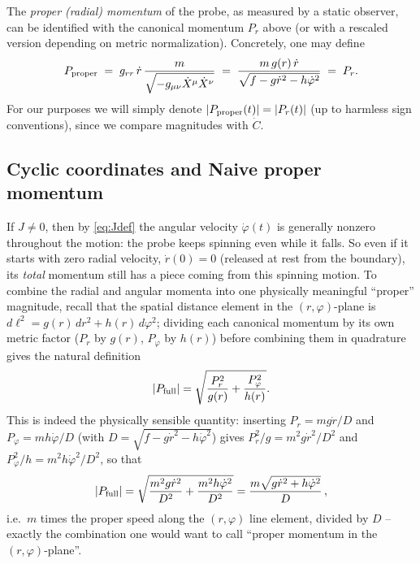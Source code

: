 \documentclass[11pt]{article}
\begin{document}
The {\it proper (radial) momentum} of the probe, as measured by a static observer, can be identified with the canonical momentum $P_r$ above (or with a rescaled version depending on metric normalization).  Concretely, one may define
\begin{equation*}
P_{\rm proper} \;=\; g_{rr}\,\dot r \,\frac{m}{\sqrt{-g_{\mu\nu}\dot X^\mu\dot X^\nu}}
\;=\; \frac{m\,g(r)\,\dot r}{\sqrt{f - g\dot r^2 - h\dot\varphi^2}} 
\;=\; P_r.
\end{equation*}
For our purposes we will simply denote $|P_{\rm proper}(t)| = |P_r(t)|$ (up to harmless sign conventions), since we compare magnitudes with $\dot C$.

\subsection{Cyclic coordinates and Naive proper momentum}

If $J\neq0$, then by \eqref{eq:Jdef} the angular velocity $\dot\varphi(t)$ is generally nonzero throughout the motion: the probe keeps spinning even while it falls. So even if it starts with zero radial velocity, $\dot r(0)=0$ (released at rest from the boundary), its \emph{total} momentum still has a piece coming from this spinning motion. To combine the radial and angular momenta into one physically meaningful ``proper'' magnitude, recall that the spatial distance element in the $(r,\varphi)$-plane is $d\ell^2=g(r)\,dr^2+h(r)\,d\varphi^2$; dividing each canonical momentum by its own metric factor ($P_r$ by $g(r)$, $P_\varphi$ by $h(r)$) before combining them in quadrature gives the natural definition
\begin{equation}
|P_{\rm full}| = \sqrt{\frac{P_r^2}{g(r)} + \frac{P_\varphi^2}{h(r)}}.
\label{eq:Pfull-def}
\end{equation}
This is indeed the physically sensible quantity: inserting $P_r=mg\dot r/D$ and $P_\varphi=mh\dot\varphi/D$ (with $D=\sqrt{f-g\dot r^2-h\dot\varphi^2}$) gives $P_r^2/g=m^2g\dot r^2/D^2$ and $P_\varphi^2/h=m^2h\dot\varphi^2/D^2$, so that
\begin{equation}
|P_{\rm full}|=\sqrt{\frac{m^2g\dot r^2}{D^2}+\frac{m^2h\dot\varphi^2}{D^2}}=\frac{m\sqrt{g\dot r^2+h\dot\varphi^2}}{D}\,,
\end{equation}
i.e.\ $m$ times the proper speed along the $(r,\varphi)$ line element, divided by $D$ -- exactly the combination one would want to call ``proper momentum in the $(r,\varphi)$-plane''.
\end{document}
